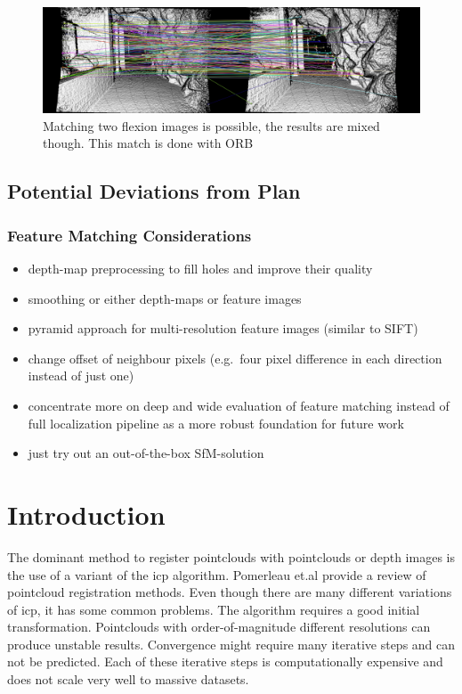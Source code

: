 \documentclass[doktyp=marbeit,fontsize=12pt,sprache=english,draft=true,hausschrift=true,fleqn]{TUBAFarbeiten}
\begin{document}
\begin{figure}[H]
	\includegraphics[width=\linewidth]{images/match-result.png}
	\caption[Examplaric Image Matching]{Matching two flexion images is possible, the results are mixed though. This match is done with ORB}
\end{figure}

\subsection{Potential Deviations from Plan}

\subsubsection*{Feature Matching Considerations}
\begin{itemize}
    \item depth-map preprocessing to fill holes and improve their quality
    \item smoothing or either depth-maps or feature images
    \item pyramid approach for multi-resolution feature images (similar to SIFT)
    \item change offset of neighbour pixels (e.g.~four pixel difference in each direction instead of just one)
    \item concentrate more on deep and wide evaluation of feature matching instead of full localization pipeline as a more robust foundation for future work
    \item just try out an out-of-the-box SfM-solution
\end{itemize}


\section{Introduction}

The dominant method to register pointclouds with pointclouds or depth
images is the use of a variant of the \gls{icp}\cite{Besl1992}
algorithm. Pomerleau et.al\cite{Pomerleau2015} provide a review of pointcloud registration methods.
Even though there are many different variations of \gls{icp}, it has
some common problems. The algorithm requires a good initial
transformation. Pointclouds with order-of-magnitude different
resolutions can produce unstable results. Convergence might require many
iterative steps and can not be predicted. Each of these iterative steps
is computationally expensive and does not scale very well to massive
datasets.
\end{document}
